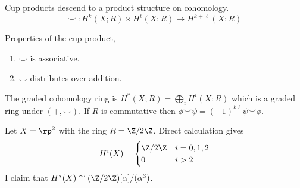 \documentclass[12pt]{extarticle}
\begin{document}
\begin{proposition}
Cup products descend to a product structure on cohomology.
\[\smile \: : H^k(X ; R) \times H^{\ell}(X ; R) \to H^{k + \ell}(X ; R) \]
\end{proposition}

\begin{proposition}
Properties of the cup product,
\begin{enumerate}
\item $\smile$ is associative.
\item $\smile$ distributes over addition.
\end{enumerate}
\end{proposition}

\begin{definition}
The graded cohomology ring is $H^{\ast}(X ; R) = \bigoplus\limits_{i} H^i(X ; R)$ which is a graded ring under $(+, \smile)$. If $R$ is commutative then $\phi \smile \psi = (-1)^{k \ell} \psi \smile \phi$. 
\end{definition}

\begin{example}
Let $X = \rp^2$ with the ring $R = \Z / 2 \Z$. Direct calculation gives \[ H^i(X) = 
\begin{cases}
\Z / 2 \Z & i = 0, 1, 2
\\
0 & i > 2
\end{cases}\]
I claim that $H^{\ast}(X) \cong (\Z / 2 \Z) [\alpha] / (\alpha^3)$.
\end{example}
\end{document}
